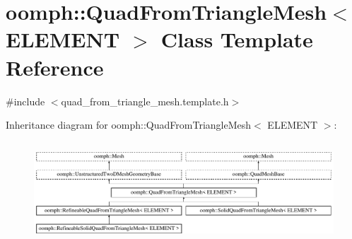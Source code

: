 \hypertarget{classoomph_1_1QuadFromTriangleMesh}{}\section{oomph\+:\+:Quad\+From\+Triangle\+Mesh$<$ E\+L\+E\+M\+E\+NT $>$ Class Template Reference}
\label{classoomph_1_1QuadFromTriangleMesh}


{\ttfamily \#include $<$quad\+\_\+from\+\_\+triangle\+\_\+mesh.\+template.\+h$>$}

Inheritance diagram for oomph\+:\+:Quad\+From\+Triangle\+Mesh$<$ E\+L\+E\+M\+E\+NT $>$\+:\begin{figure}[H]
\begin{center}
\leavevmode
\includegraphics[height=3.783784cm]{classoomph_1_1QuadFromTriangleMesh}
\end{center}
\end{figure}
